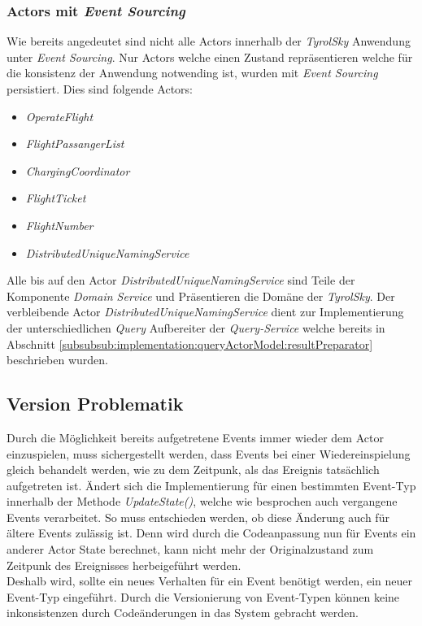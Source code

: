 \subsubsection{Actors mit \textit{Event Sourcing}}
Wie bereits angedeutet sind nicht alle Actors innerhalb der \textit{TyrolSky} Anwendung unter \textit{Event Sourcing}. Nur Actors welche einen Zustand repräsentieren welche für die konsistenz der Anwendung notwending ist, wurden mit \textit{Event Sourcing} persistiert. Dies sind folgende Actors: 
\begin{itemize}
    \item{\textit{OperateFlight}}
    \item{\textit{FlightPassangerList}}
    \item{\textit{ChargingCoordinator}}
    \item{\textit{FlightTicket}}
    \item{\textit{FlightNumber}}
    \item{\textit{DistributedUniqueNamingService}}
\end{itemize}
Alle bis auf den Actor \textit{DistributedUniqueNamingService} sind Teile der Komponente \textit{Domain Service} und Präsentieren die Domäne der \textit{TyrolSky}. Der verbleibende Actor \textit{DistributedUniqueNamingService} dient zur Implementierung der unterschiedlichen \textit{Query} Aufbereiter der \textit{Query-Service} welche bereits in Abschnitt \ref{subsubsub:implementation:queryActorModel:resultPreparator} beschrieben wurden.

\subsection{Version Problematik}
Durch die Möglichkeit bereits aufgetretene Events immer wieder dem Actor einzuspielen, muss sichergestellt werden, dass Events bei einer Wiedereinspielung gleich behandelt werden, wie zu dem Zeitpunk, als das Ereignis tatsächlich aufgetreten ist. Ändert sich die Implementierung für einen bestimmten Event-Typ innerhalb der Methode \textit{UpdateState()}, welche wie besprochen auch vergangene Events verarbeitet. So muss entschieden werden, ob diese Änderung auch für ältere Events zulässig ist. Denn wird durch die Codeanpassung nun für Events ein anderer Actor State berechnet, kann nicht mehr der Originalzustand zum Zeitpunk des Ereignisses herbeigeführt werden. \\
Deshalb wird, sollte ein neues Verhalten für ein Event benötigt werden, ein neuer Event-Typ eingeführt. Durch die Versionierung von Event-Typen können keine inkonsistenzen durch Codeänderungen in das System gebracht werden. 
